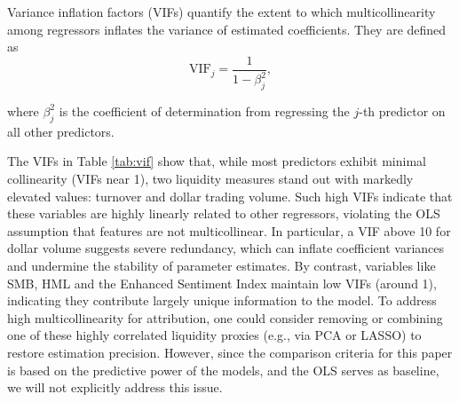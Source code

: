  Variance inflation factors (VIFs) quantify the extent to which multicollinearity among regressors inflates the variance of estimated coefficients. They are defined as
 \begin{equation}
 \label{eq:vif}
\mathrm{VIF}_j = \frac{1}{1 - \beta_j^2},
\end{equation}

where $\beta_j^2$ is the coefficient of determination from regressing the $j$-th predictor on all other predictors.

 The VIFs in Table \ref{tab:vif} show that, while most predictors exhibit minimal collinearity (VIFs near 1), two liquidity measures stand out with markedly elevated values: turnover and dollar trading volume. Such high VIFs indicate that these variables are highly linearly related to other regressors, violating the OLS assumption that features are not multicollinear. In particular, a VIF above 10 for dollar volume suggests severe redundancy, which can inflate coefficient variances and undermine the stability of parameter estimates. By contrast, variables like SMB, HML and the Enhanced Sentiment Index maintain low VIFs (around 1), indicating they contribute largely unique information to the model. To address high multicollinearity for attribution, one could consider removing or combining one of these highly correlated liquidity proxies (e.g., via PCA or LASSO) to restore estimation precision. However, since the comparison criteria for this paper is based on the predictive power of the models, and the OLS serves as baseline, we will not explicitly address this issue.


 \begin{table}[H]
    \centering
    \caption{\textit{Variance inflation factors}}
    \label{tab:vif}
\end{table}

